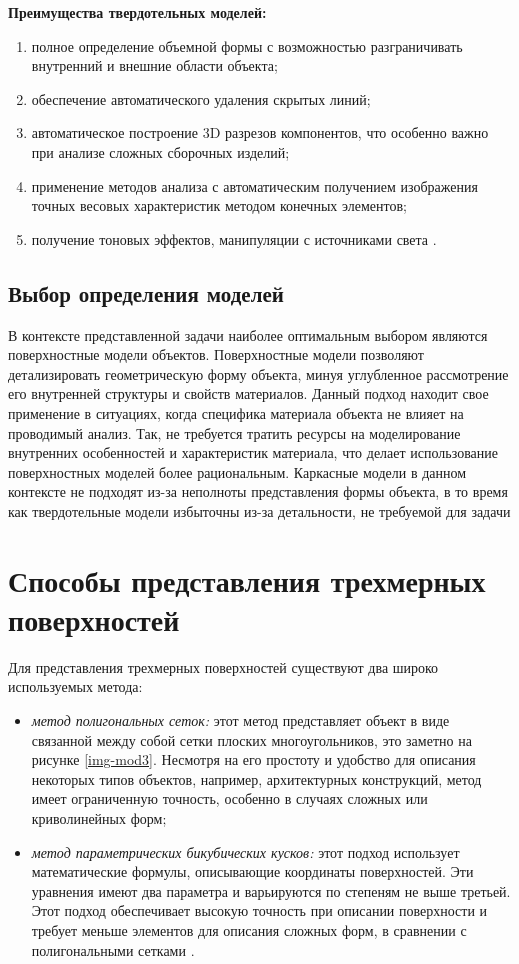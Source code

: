 \textbf{Преимущества твердотельных моделей:}
\begin{enumerate}
	\item полное определение объемной формы с возможностью разграничивать внутренний и внешние области объекта;
	\item  обеспечение автоматического удаления скрытых линий;
	\item автоматическое построение 3D разрезов компонентов, что особенно важно при анализе сложных сборочных изделий;
	\item  применение методов анализа с автоматическим получением изображения точных весовых характеристик методом конечных элементов;
	\item получение тоновых эффектов, манипуляции с источниками
	света \cite{model_geom_01}.
\end{enumerate}


\subsection{Выбор определения моделей} %
В контексте представленной задачи наиболее оптимальным выбором являются поверхностные модели объектов. Поверхностные модели позволяют детализировать геометрическую форму объекта, минуя углубленное рассмотрение его внутренней структуры и свойств материалов. Данный подход находит свое применение в ситуациях, когда специфика материала объекта не влияет на проводимый анализ. Так, не требуется тратить ресурсы на моделирование внутренних особенностей и характеристик материала, что делает использование поверхностных моделей более рациональным. Каркасные модели в данном контексте не подходят из-за неполноты представления формы объекта, в то время как твердотельные модели избыточны из-за детальности, не требуемой для задачи


\section{Способы представления трехмерных поверхностей}

Для представления трехмерных поверхностей существуют два широко используемых метода:

\begin{itemize}
	\item \textit{метод полигональных сеток:} этот метод представляет объект в виде связанной между собой сетки плоских многоугольников, это заметно на рисунке  \ref{img-mod3}. Несмотря на его простоту и удобство для описания некоторых типов объектов, например, архитектурных конструкций, метод имеет ограниченную точность, особенно в случаях сложных или криволинейных форм;
	\item \textit{метод параметрических бикубических кусков: }этот подход использует математические формулы, описывающие координаты поверхностей. Эти уравнения имеют два параметра и варьируются по степеням не выше третьей. Этот подход обеспечивает высокую точность при описании поверхности и требует меньше элементов для описания сложных форм, в сравнении с полигональными сетками \cite{model_geom}.
\end{itemize}

